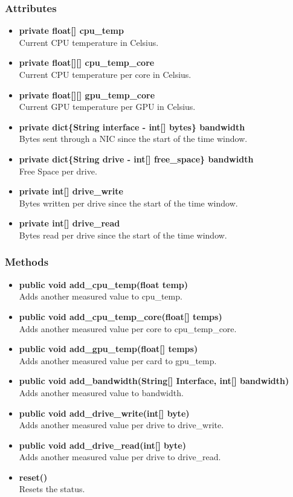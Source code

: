 \subsubsection{Attributes}
\begin{itemize}
	\item \textbf{private float[] cpu\_temp}\\
	Current CPU temperature in Celsius.
	\item \textbf{private float[][] cpu\_temp\_core}\\
	Current CPU temperature per core in Celsius.
	\item \textbf{private float[][] gpu\_temp\_core}\\
	Current GPU temperature per GPU in Celsius.
	\item \textbf{private dict\{String interface - int[] bytes\} bandwidth }\\
	Bytes sent through a NIC since the start of the time window.
	\item \textbf{private dict\{String drive - int[] free\_space\} bandwidth}\\
	Free Space per drive.
	\item \textbf{private int[] drive\_write}\\
	Bytes written per drive since the start of the time window.
	\item \textbf{private int[] drive\_read}\\
	Bytes read per drive since the start of the time window.
\end{itemize}

\subsubsection{Methods}
\begin{itemize}
	\item \textbf{public void add\_cpu\_temp(float temp)}\\
	Adds another measured value to cpu\_temp.
	\item \textbf{public void add\_cpu\_temp\_core(float[] temps)}\\
	Adds another measured value per core to cpu\_temp\_core.
	\item \textbf{public void add\_gpu\_temp(float[] temps)}\\
	Adds another measured value per card to gpu\_temp.
	\item \textbf{public void add\_bandwidth(String[] Interface, int[] bandwidth)}\\
	Adds another measured value to bandwidth.
	\item \textbf{public void add\_drive\_write(int[] byte)}\\
	Adds another measured value per drive to drive\_write.
	\item \textbf{public void add\_drive\_read(int[] byte)}\\
	Adds another measured value per drive to drive\_read.
	\item \textbf{reset()}\\
	Resets the status.
\end{itemize}

